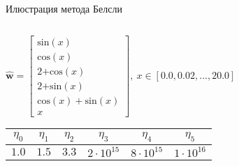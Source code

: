 \documentclass[10pt]{beamer}
\begin{document}
\begin{frame}{Илюстрация метода Белсли}

\begin{columns}
\begin{column}{0.65\textwidth}

{
\fontsize{8}{10} 
\begin{center}
$\hat{\textbf{w}} = \begin{bmatrix}
\text{sin}(x)\\
\text{cos}(x)\\
\text{2+cos}(x)\\
\text{2+sin}(x)\\
\text{cos}(x) + \text{sin}(x)\\
x
\end{bmatrix},~x \in [0.0, 0.02, ..., 20.0]$
\end{center}

\begin{table}[h]
\begin{center}
\begin{tabular}{|c|c|c|c|c|c|}
\hline
$\eta_0$ & $\eta_1$ & $\eta_2$ & $\eta_3$ & $\eta_4$ & $\eta_5$\\
\hline
$1.0$ & $1.5$ & $3.3$ & $2\cdot 10^{15}$ & $8\cdot 10^{15}$ & $1\cdot 10^{16}$\\
\hline
\end{tabular}
\end{center}
\end{table}
}

\end{column}
\begin{column}{0.5\textwidth}



\end{column}
\end{columns}

\end{frame}
\end{document}
